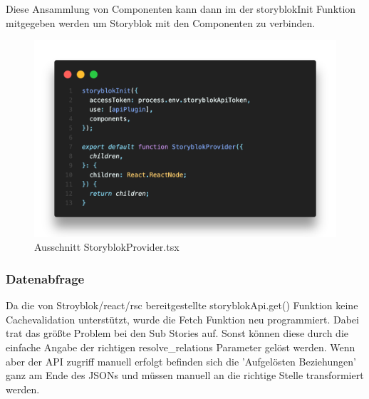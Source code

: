 Diese Ansammlung von Componenten kann dann im der storyblokInit Funktion mitgegeben werden um Storyblok mit den Componenten zu verbinden. 

\begin{figure}[H]
    \centering
    \includegraphics[width=\linewidth]{pics/sb-provider-03.png}
    \caption{Ausschnitt StoryblokProvider.tsx}
\end{figure}

\subsubsection*{Datenabfrage}
Da die von Stroyblok/react/rsc bereitgestellte storyblokApi.get() Funktion keine Cachevalidation unterstützt, wurde die Fetch Funktion neu programmiert. Dabei trat das größte Problem bei den Sub Stories auf. Sonst können diese durch die einfache Angabe der richtigen resolve\_relations Parameter gelöst werden. Wenn aber der API zugriff manuell erfolgt befinden sich die 'Aufgelösten Beziehungen' ganz am Ende des JSONs und müssen manuell an die richtige Stelle transformiert werden. 


